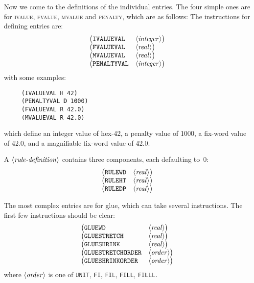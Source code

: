 \documentclass[fleqn]{article}
\newcommand{\showrule}{\langle\mbox{\emph{rule-definition}}\rangle}
\newcommand{\showinteger}{\langle\mbox{\emph{integer}}\rangle}
\newcommand{\showfixword}{\langle\mbox{\emph{real}}\rangle}
\newcommand{\showorder}{\langle\mbox{\emph{order}}\rangle}
\begin{document}
Now we come to the definitions of the individual entries.
The four simple ones are for \textsc{ivalue}, \textsc{fvalue},
\textsc{mvalue} and \textsc{penalty}, which are as follows:
The instructions for defining entries are:
\[
\begin{array}{ll}
     \bigl(\texttt{IVALUEVAL} & \showinteger\bigr)\\
     \bigl(\texttt{FVALUEVAL} & \showfixword\bigr)\\
     \bigl(\texttt{MVALUEVAL} & \showfixword\bigr)\\
     \bigl(\texttt{PENALTYVAL}& \showinteger\bigr)\\
\end{array}
\]
with some examples:
\begin{verbatim}
     (IVALUEVAL H 42)
     (PENALTYVAL D 1000)
     (FVALUEVAL R 42.0)
     (MVALUEVAL R 42.0)
\end{verbatim}
which define an integer value of hex-42, a penalty value of 1000,
a fix-word value of 42.0, and a magnifiable fix-word value of
42.0.

A $\showrule$ contains three components, each defaulting to~0:
\[
\begin{array}{ll}
     \bigl(\texttt{RULEWD} & \showfixword\bigr)\\
     \bigl(\texttt{RULEHT} & \showfixword\bigr)\\
     \bigl(\texttt{RULEDP} & \showfixword\bigr)\\
\end{array}
\]

The most complex entries are for glue, which can take several
instructions.  The first few instructions should be clear:
\[
\begin{array}{ll}
     \bigl(\texttt{GLUEWD}      & \showfixword\bigr)\\
     \bigl(\texttt{GLUESTRETCH} & \showfixword\bigr)\\
     \bigl(\texttt{GLUESHRINK}  & \showfixword\bigr)\\
     \bigl(\texttt{GLUESTRETCHORDER} & \showorder\bigr)\\
     \bigl(\texttt{GLUESHRINKORDER} & \showorder\bigr)\\
\end{array}
\]
where $\showorder$ is one of \texttt{UNIT}, \texttt{FI}, \texttt{FIL},
\texttt{FILL}, \texttt{FILLL}.
\end{document}
